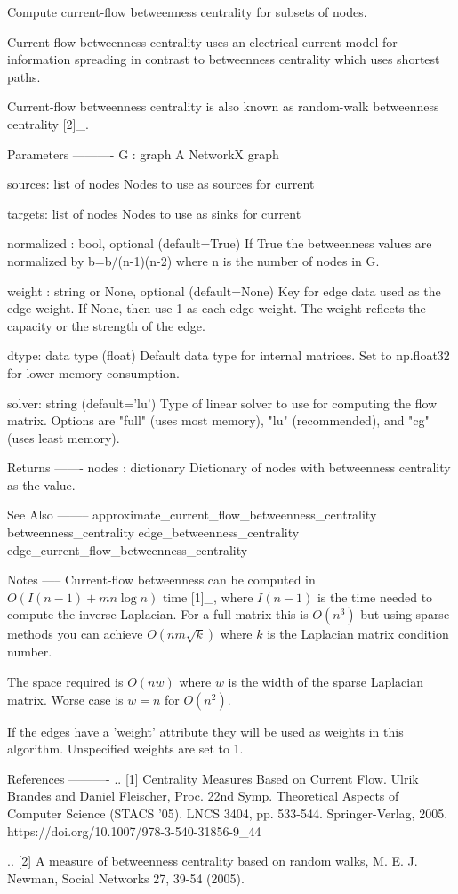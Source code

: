 \begin{DoxyVerb}Compute current-flow betweenness centrality for subsets of nodes.

Current-flow betweenness centrality uses an electrical current
model for information spreading in contrast to betweenness
centrality which uses shortest paths.

Current-flow betweenness centrality is also known as
random-walk betweenness centrality [2]_.

Parameters
----------
G : graph
  A NetworkX graph

sources: list of nodes
  Nodes to use as sources for current

targets: list of nodes
  Nodes to use as sinks for current

normalized : bool, optional (default=True)
  If True the betweenness values are normalized by b=b/(n-1)(n-2) where
  n is the number of nodes in G.

weight : string or None, optional (default=None)
  Key for edge data used as the edge weight.
  If None, then use 1 as each edge weight.
  The weight reflects the capacity or the strength of the
  edge.

dtype: data type (float)
  Default data type for internal matrices.
  Set to np.float32 for lower memory consumption.

solver: string (default='lu')
   Type of linear solver to use for computing the flow matrix.
   Options are "full" (uses most memory), "lu" (recommended), and
   "cg" (uses least memory).

Returns
-------
nodes : dictionary
   Dictionary of nodes with betweenness centrality as the value.

See Also
--------
approximate_current_flow_betweenness_centrality
betweenness_centrality
edge_betweenness_centrality
edge_current_flow_betweenness_centrality

Notes
-----
Current-flow betweenness can be computed in $O(I(n-1)+mn \log n)$
time [1]_, where $I(n-1)$ is the time needed to compute the
inverse Laplacian.  For a full matrix this is $O(n^3)$ but using
sparse methods you can achieve $O(nm{\sqrt k})$ where $k$ is the
Laplacian matrix condition number.

The space required is $O(nw)$ where $w$ is the width of the sparse
Laplacian matrix.  Worse case is $w=n$ for $O(n^2)$.

If the edges have a 'weight' attribute they will be used as
weights in this algorithm.  Unspecified weights are set to 1.

References
----------
.. [1] Centrality Measures Based on Current Flow.
   Ulrik Brandes and Daniel Fleischer,
   Proc. 22nd Symp. Theoretical Aspects of Computer Science (STACS '05).
   LNCS 3404, pp. 533-544. Springer-Verlag, 2005.
   https://doi.org/10.1007/978-3-540-31856-9_44

.. [2] A measure of betweenness centrality based on random walks,
   M. E. J. Newman, Social Networks 27, 39-54 (2005).
\end{DoxyVerb}
